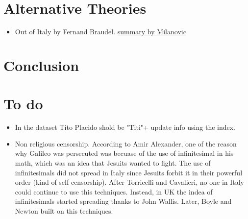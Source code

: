 \documentclass[12pt]{article}
\begin{document}
\section{Alternative Theories}

\begin{itemize}
\item Out of Italy by Fernand Braudel. \href{https://www.globalpolicyjournal.com/blog/07/08/2020/darkness-illuminated-world-italy-braudel}{summary by Milanovic}	
\end{itemize}

\section{Conclusion}

\section{To do}
\begin{itemize}
\item In the dataset Tito Placido shold be "Titi"+ update info using the index.
\item Non religious censorship. According to Amir Alexander, one of the reason why Galileo was persecuted was becuase of the use of infinitesimal in his math, which was an idea that Jesuits wanted to fight. The use of infinitesimals did not spread in Italy since Jesuits forbit it in their powerful order (kind of self censorship). After Torricelli and Cavalieri, no one in Italy could continue to use this techniques. Instead, in UK the indea of infinitesimals started spreading thanks to John Wallis. Later, Boyle and Newton built on this techniques.	
\end{itemize}	
\end{document}
